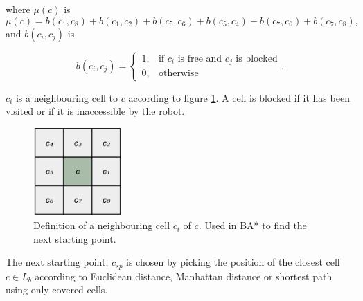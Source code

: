 where $\mu(c)$ is 
\begin{equation}
    \mu(c) = b(c_1,c_8) + b(c_1,c_2) + b(c_5,c_6) + b(c_5,c_4) +b(c_7,c_6) + b(c_7,c_8) ,
\end{equation}
and $b(c_i, c_j)$ is

\begin{equation}
    b(c_i, c_j) = \begin{cases} 
        1, & \mbox{if } c_i \mbox{ is free and } c_j \mbox{ is blocked}\\ 
        0, & \mbox{otherwise} 
    \end{cases}.
\end{equation}

$c_i$ is a neighbouring cell to $c$ according to figure \ref{fig:tilesdefinition}. A cell is blocked if it has been visited or if it is inaccessible by the robot.

\begin{figure}
    \centering
    \includegraphics[width=0.3\textwidth]{figures/tilesscheme.png}
    \caption{Definition of a neighbouring cell $c_i$ of $c$. Used in BA* to find the next starting point.}
    \label{fig:tilesdefinition}
\end{figure}

The next starting point, $c_{sp}$ is chosen by picking the position of the closest cell $c \in L_b$ according to Euclidean distance, Manhattan distance or shortest path using only covered cells.

